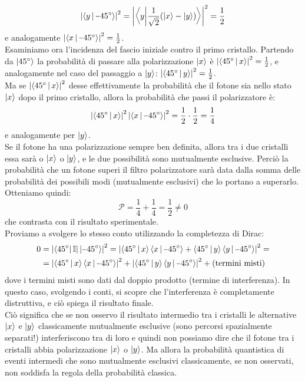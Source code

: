\documentclass[FisicaTeorica.tex]{subfiles}
\begin{document}
\[
\abs{\braket{y|\minus 45^\circ}}^2 = \abs{\left\langle y\bigg|\frac{1}{\sqrt{2}}(\ket{x}-\ket{y})\right\rangle}^2 = \frac{1}{2} 
\]
e analogamente $\abs{\braket{x|\minus 45^\circ}}^2 = \frac{1}{2}$.\\
Esaminiamo ora l'incidenza del fascio iniziale contro il primo cristallo. Partendo da $\Ket{45^\circ}$ la probabilità di passare alla polarizzazione $\Ket{x}$ è $\left|\Braket{45^\circ |x}\right|^2 = \frac{1}{2}$, e analogamente nel caso del passaggio a $\Ket{y}$: $\left|\Braket{45^\circ|y}\right|^2=\frac{1}{2}$.\\
Ma se $\left|\Braket{45^\circ |x}\right|^2$ desse effettivamente la probabilità che il fotone sia nello stato $\Ket{x}$ dopo il primo cristallo, allora la probabilità che passi il polarizzatore è:
\[
\abs{\braket{45^\circ |x}}^2 \abs{\braket{{x}|\minus 45^\circ}}^2 = \frac{1}{2}\cdot \frac{1}{2} = \frac{1}{4}
\]
e analogamente per $\Ket{y}$.\\
Se il fotone ha una polarizzazione sempre ben definita, allora tra i due cristalli essa sarà o $\Ket{x}$ o $\Ket{y}$, e le due possibilità sono mutualmente esclusive.
Perciò la probabilità che un fotone superi il filtro polarizzatore sarà data dalla somma delle probabilità dei possibili modi (mutualmente esclusivi) che lo portano a superarlo. Otteniamo quindi:
\[
\mathcal{P} = \frac{1}{4} + \frac{1}{4} = \frac{1}{2} \neq 0
\]
che contrasta con il risultato sperimentale.\\
Proviamo a svolgere lo stesso conto utilizzando la completezza di Dirac:
\begin{align*}
0 &= \abs{\bra{45^\circ} \bb{I}|\ket{\minus 45^\circ}}^2 = \abs{\braket{45^\circ|x}\braket{x|\minus 45^\circ} + \braket{45^\circ|y}\braket{y|\minus 45^\circ}}^2 =\\
&= \abs{\braket{45^\circ|x}\braket{x|\minus 45^\circ}}^2 + \abs{\braket{45^\circ|y}\braket{y|\minus 45^\circ}}^2 + \text{(termini misti)}
\end{align*}
dove i termini misti sono dati dal doppio prodotto (termine di interferenza). In questo caso, svolgendo i conti, si scopre che l'interferenza è completamente distruttiva, e ciò spiega il risultato finale.\\
Ciò significa che se non osservo il risultato intermedio tra i cristalli le alternative $\Ket{x}$ e $\Ket{y}$ classicamente mutualmente esclusive (sono percorsi spazialmente separati!) interferiscono tra di loro e quindi non possiamo dire che il fotone tra i cristalli abbia polarizzazione $\Ket{x}$ o $\Ket{y}$. Ma allora la probabilità quantistica di eventi intermedi che sono mutualmente esclusivi classicamente, se non osservati, non soddisfa la regola della probabilità classica.\\
\end{document}
